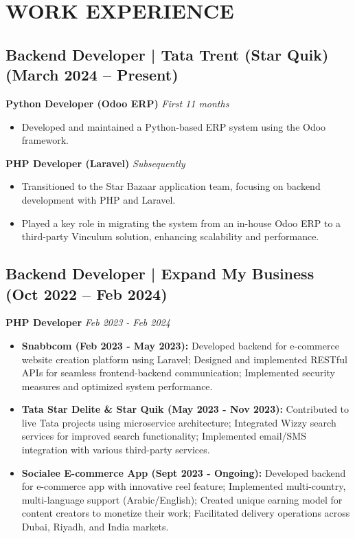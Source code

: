 \documentclass[10pt,a4paper]{article}
\begin{document}
\section*{WORK EXPERIENCE}

\subsection*{Backend Developer | Tata Trent (Star Quik) (March 2024 – Present)}

\textbf{Python Developer (Odoo ERP)} \hfill \textit{First 11 months}
\begin{itemize}[leftmargin=*, itemsep=0pt, topsep=2pt, parsep=0pt]
    \item Developed and maintained a Python-based ERP system using the Odoo framework.
\end{itemize}

\vspace{1mm}
\textbf{PHP Developer (Laravel)} \hfill \textit{Subsequently}
\begin{itemize}[leftmargin=*, itemsep=0pt, topsep=2pt, parsep=0pt]
    \item Transitioned to the Star Bazaar application team, focusing on backend development with PHP and Laravel.
    \item Played a key role in migrating the system from an in-house Odoo ERP to a third-party Vinculum solution, enhancing scalability and performance.
\end{itemize}
\vspace{2mm}

\subsection*{Backend Developer | Expand My Business (Oct 2022 – Feb 2024)}

\textbf{PHP Developer} \hfill \textit{Feb 2023 - Feb 2024}
\begin{itemize}[leftmargin=*, itemsep=0pt, topsep=2pt, parsep=0pt]
    \item \textbf{Snabbcom (Feb 2023 - May 2023):} Developed backend for e-commerce website creation platform using Laravel; Designed and implemented RESTful APIs for seamless frontend-backend communication; Implemented security measures and optimized system performance.
    \item \textbf{Tata Star Delite \& Star Quik (May 2023 - Nov 2023):} Contributed to live Tata projects using microservice architecture; Integrated Wizzy search services for improved search functionality; Implemented email/SMS integration with various third-party services.
    \item \textbf{Socialee E-commerce App (Sept 2023 - Ongoing):} Developed backend for e-commerce app with innovative reel feature; Implemented multi-country, multi-language support (Arabic/English); Created unique earning model for content creators to monetize their work; Facilitated delivery operations across Dubai, Riyadh, and India markets.
\end{itemize}
\end{document}
